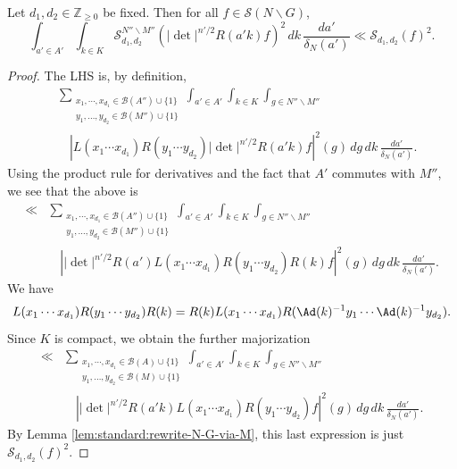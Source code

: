 \begin{lemma}\label{lem:induct-sobolev-norms}
  Let $d_1, d_2 \in \mathbb{Z}_{\geq 0}$ be fixed.  Then for all $f \in \mathcal{S}(N \backslash G)$,
  \begin{equation*}
    \int_{a' \in A'}
    \int_{k \in K}
    \mathcal{S} _{d_1, d_2} ^{N'' \backslash M''}
    \left(
      |\det|^{n'/2}
      R(a' k) f
    \right)^2
    \, d k
    \, \frac{d a '}{\delta_N(a')}
    \ll
    \mathcal{S}_{d_1,d_2}(f)^2.
  \end{equation*}
\end{lemma}
\begin{proof}
  The LHS is, by definition,
  \begin{align*}
    &\sum_{
      \substack{
      x_1, \dotsb, x_{d_1} \in \mathcal{B}(A'') \cup \{1\}  \\
    y_1, \dotsc, y_{d_2 } \in \mathcal{B}(M'') \cup \{1\}
    }
    }
    \int_{a' \in A'}
    \int_{k \in K}
    \int_{g \in N'' \backslash M''} \\
    &\quad \left\lvert    L(x_1 \dotsb x_{d_1}) R(y_1 \dotsb y_{d_2}) |\det|^{n'/2} R(a' k) f
      \right\rvert^2(g)
      \, d g
      \, d k
      \, \frac{d a '}{\delta_N(a')}.
  \end{align*}
  Using the product rule for derivatives and the fact that $A'$ commutes with $M''$, we see that the above is
  \begin{align*}
    \ll &\sum_{
        \substack{
        x_1, \dotsb, x_{d_1} \in \mathcal{B}(A'') \cup \{1\}  \\
    y_1, \dotsc, y_{d_2 } \in \mathcal{B}(M'') \cup \{1\}
    }
    }
    \int_{a' \in A'}
    \int_{k \in K}
    \int_{g \in N'' \backslash M''} \\
      &\quad \left\lvert  |\det|^{n'/2} R(a')   L(x_1 \dotsb x_{d_1}) R(y_1 \dotsb y_{d_2}) R(k) f
        \right\rvert^2(g)
        \, d g
        \, d k \, \frac{d a '}{\delta_N(a')}.
  \end{align*}
  We have
  \begin{equation*}
    L(x_1 \dotsb x_{d_1}) R(y_1 \dotsb y_{d_2}) R(k)
    =
    R(k) L(x_1 \dotsb x_{d_1}) R(\Ad(k)^{-1} y_1 \dotsb \Ad(k)^{-1} y_{d_2}).
  \end{equation*}
  Since $K$ is compact, we obtain the further majorization
  \begin{align*}
    \ll &\sum_{
        \substack{
        x_1, \dotsb, x_{d_1} \in \mathcal{B}(A) \cup \{1\}  \\
    y_1, \dotsc, y_{d_2 } \in \mathcal{B}(M) \cup \{1\}
    }
    }
    \int_{a' \in A'}
    \int_{k \in K}
    \int_{g \in N'' \backslash M''} \\
      &\quad \left\lvert  |\det|^{n'/2} R(a' k)   L(x_1 \dotsb x_{d_1}) R(y_1 \dotsb y_{d_2}) f
        \right\rvert^2(g)
        \, d g
        \, d k
        \, \frac{d a '}{\delta_N(a')}.
  \end{align*}
  By Lemma \ref{lem:standard:rewrite-N-G-via-M}, this last expression is just $\mathcal{S}_{d_1,d_2}(f)^2$.
\end{proof}

